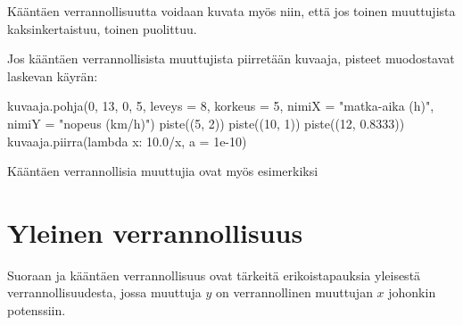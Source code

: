 Kääntäen verrannollisuutta voidaan kuvata myös niin, että jos toinen muuttujista kaksinkertaistuu, toinen puolittuu.

Jos kääntäen verrannollisista muuttujista piirretään kuvaaja, pisteet muodostavat laskevan käyrän:

\begin{center}
\begin{kuva}
    kuvaaja.pohja(0, 13, 0, 5, leveys = 8, korkeus = 5, nimiX = "matka-aika (h)", nimiY = "nopeus (km/h)")
    piste((5, 2))
    piste((10, 1))
    piste((12, 0.8333))
    kuvaaja.piirra(lambda x: 10.0/x, a = 1e-10)
\end{kuva}
\end{center}

Kääntäen verrannollisia muuttujia ovat myös esimerkiksi

\section*{Yleinen verrannollisuus}

Suoraan ja kääntäen verrannollisuus ovat tärkeitä erikoistapauksia yleisestä verrannollisuudesta, jossa muuttuja $y$ on verrannollinen muuttujan $x$ johonkin potenssiin.

%
%
%
%
